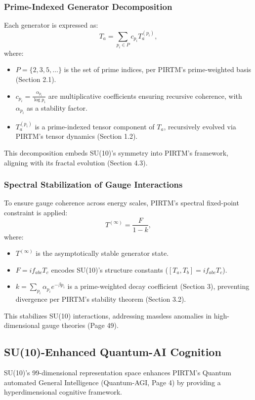 \documentclass{article}
\theoremstyle{plain}
\begin{document}
\subsubsection{Prime-Indexed Generator Decomposition}
Each generator is expressed as:
\[
T_a = \sum_{p_i \in P} c_{p_i} T_a^{(p_i)},
\]
where:
\begin{itemize}
    \item \( P = \{2, 3, 5, \dots\} \) is the set of prime indices, per PIRTM’s prime-weighted basis (Section 2.1).
    \item \( c_{p_i} = \frac{\alpha_{p_i}}{\log p_i} \) are multiplicative coefficients ensuring recursive coherence, with \( \alpha_{p_i} \) as a stability factor.
    \item \( T_a^{(p_i)} \) is a prime-indexed tensor component of \( T_a \), recursively evolved via PIRTM’s tensor dynamics (Section 1.2).
\end{itemize}
This decomposition embeds SU(10)’s symmetry into PIRTM’s framework, aligning with its fractal evolution (Section 4.3).

\subsubsection{Spectral Stabilization of Gauge Interactions}
To ensure gauge coherence across energy scales, PIRTM’s spectral fixed-point constraint is applied:
\[
T^{(\infty)} = \frac{F}{1 - k},
\]
where:
\begin{itemize}
    \item \( T^{(\infty)} \) is the asymptotically stable generator state.
    \item \( F = i f_{abc} T_c \) encodes SU(10)’s structure constants (\( [T_a, T_b] = i f_{abc} T_c \)).
    \item \( k = \sum_{p_i} \alpha_{p_i} e^{-\beta p_i} \) is a prime-weighted decay coefficient (Section 3), preventing divergence per PIRTM’s stability theorem (Section 3.2).
\end{itemize}
This stabilizes SU(10) interactions, addressing massless anomalies in high-dimensional gauge theories (Page 49).

\subsection{SU(10)-Enhanced Quantum-AI Cognition}

SU(10)’s 99-dimensional representation space enhances PIRTM’s Quantum automated General Intelligence (Quantum-AGI, Page 4) by providing a hyperdimensional cognitive framework.
\end{document}
